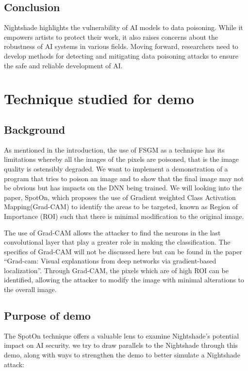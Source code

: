 \documentclass{article}
\begin{document}
\subsection{Conclusion}

Nightshade highlights the vulnerability of AI models to data poisoning. While
it empowers artists to protect their work, it also raises concerns about the
robustness of AI systems in various fields. Moving forward, researchers need to
develop methods for detecting and mitigating data poisoning attacks to ensure
the safe and reliable development of AI.

\section{Technique studied for demo}

\subsection{Background}

As mentioned in the introduction, the use of FSGM as a technique has its
limitations whereby all the images of the pixels are poisoned, that is the
image quality is ostensibly degraded. We want to implement a demonstration of a
program that tries to poison an image and to show that the final image may not
be obvious but has impacts on the DNN being trained. We will looking into the
paper, SpotOn, which proposes the use of Gradient weighted Class Activation
Mapping(Grad-CAM) to identify the areas to be targeted, known as Region of
Importance (ROI) such that there is minimal modification to the original image.

The use of Grad-CAM allows the attacker to find the neurons in the last
convolutional layer that play a greater role in making the classification. The
specifics of Grad-CAM will not be discussed here but can be found in the paper
``Grad-cam: Visual explanations from deep networks via gradient-based
localization”. Through Grad-CAM, the pixels which are of high ROI can be
identified, allowing the attacker to modify the image with minimal alterations
to the overall image.

\subsection{Purpose of demo}

The SpotOn technique offers a valuable lens to examine Nightshade's potential impact on AI security. we try to draw parallels to the Nightshade through this demo, along with ways to strengthen the demo to better simulate a Nightshade attack:
\end{document}
